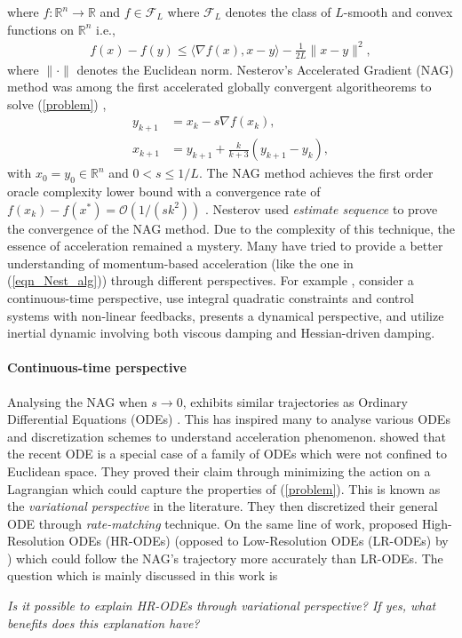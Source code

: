 \documentclass{article}
\theoremstyle{plain}
\theoremstyle{definition}
\theoremstyle{remark}
\begin{document}
where $f:\mathbb{R}^n\rightarrow \mathbb{R}$ and \(f\in\mathcal{F}_{L}\) where \(\mathcal{F}_{L}\) denotes the class of \(L\)-smooth and convex functions on \(\mathbb{R}^n\) i.e.,
\begin{align}\label{cvx-smthness}
 f(x)-f(y)\leq \langle \nabla f(x),x-y \rangle-\frac{1}{2L}\|x-y\|^2,
\end{align}
where \(\|\cdot\|\) denotes the Euclidean norm. Nesterov's Accelerated Gradient (NAG) method was among the first accelerated globally convergent algoritheorems to solve (\ref{problem}) \citep{Nesterov1983AMF},
 \begin{align}\label{eqn_Nest_alg}
    y_{k+1}&=x_k -s\nabla f(x_k),\\
    x_{k+1}&= y_{k+1}+\frac{k}{k+3} (y_{k+1}-y_{k}),\nonumber
\end{align}
with \(x_0=y_0\in\mathbb R^n\) and \(0< s\leq 1/L\). The NAG method achieves the first order oracle complexity lower bound with a convergence rate of \(f(x_k)-f(x^*)=\mathcal O (1/(sk^2))\) \citep{nesterov2003introductory}. Nesterov used \textit{estimate sequence} to prove the convergence of the NAG method. Due to the complexity of this technique, the essence of acceleration remained a mystery. Many have tried to provide a better understanding of momentum-based acceleration (like the one in (\ref{eqn_Nest_alg})) through different perspectives. For example \citep{JMLR:v17:15-084,shi2019acceleration,Shi2021UnderstandingTA,sanz2021connections}, consider a continuous-time perspective, \cite{Lessard2016AnalysisAD,doi:10.1137/17M1136845} use integral quadratic constraints and control systems with non-linear feedbacks, \cite{muehlebach2022constraints,muehlebach2023accelerated,muehlebach2019dynamical} presents a dynamical perspective, and \cite{attouch2020first,attouch2021convergence} utilize inertial dynamic involving both viscous damping and Hessian-driven damping. 
\paragraph{Continuous-time perspective}Analysing the NAG when \(s\rightarrow 0\), exhibits similar trajectories as Ordinary Differential Equations (ODEs) \citep{JMLR:v17:15-084}. This has inspired many to analyse various ODEs and discretization schemes to understand acceleration phenomenon. \cite{WibisonoE7351,wilson2021lyapunov} showed that the recent ODE is a special case of a family of ODEs which were not confined to Euclidean space. They proved their claim through minimizing the action on a Lagrangian which could capture the properties of (\ref{problem}). This is known as the \textit{variational perspective} in the literature. They then discretized their general ODE through \textit{rate-matching} technique. On the same line of work, \cite{Shi2021UnderstandingTA} proposed High-Resolution ODEs (HR-ODEs) (opposed to Low-Resolution ODEs (LR-ODEs) by \cite{JMLR:v17:15-084}) which could follow the NAG's trajectory more accurately than LR-ODEs. The question which is mainly discussed in this work is
\begin{center}
   \textit{Is it possible to explain HR-ODEs through variational perspective? If yes, what benefits does this explanation have?} 
\end{center}
\end{document}
